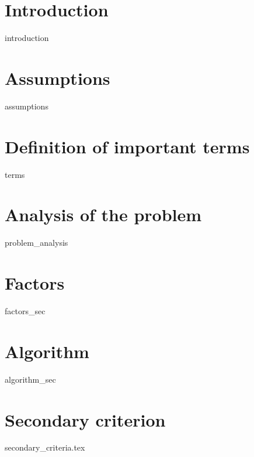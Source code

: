 
\section{Introduction}
{introduction}

\section{Assumptions}
{assumptions}

\section{Definition of important terms}
\begin{labeling}{\hspace{3cm}}
{terms}
\end{labeling}

\section{Analysis of the problem}
{problem_analysis}

\section{Factors}
{factors_sec}

\section{Algorithm}
{algorithm_sec}

\section{Secondary criterion}
{secondary_criteria.tex}